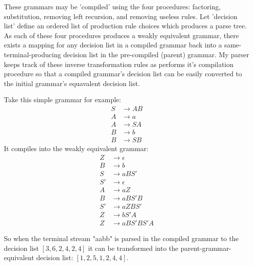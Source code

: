 \documentclass[11pt]{article}
\begin{document}
These grammars may be 'compiled' using the four procedures:
factoring, substitution, removing left recursion, and removing useless
rules. Let 'decision list' define an ordered list of production rule
choices which produces a parse tree.
As each of these four procedures produces a weakly equivalent grammar,
there exists a mapping for any decision list in a compiled grammar
back into a same-terminal-producing decision list in the pre-compiled (parent) grammar.
My parser keeps track of these inverse transformation rules as performs
it's compilation procedure so that a compiled grammar's decision list can be easily
converted to the initial grammar's equavalent decision list. 

Take this simple grammar for example:
\setcounter{equation}{0}
\begin{align}
S &\rightarrow A B\\
A &\rightarrow a\\
A &\rightarrow S A\\
B &\rightarrow b\\
B &\rightarrow S B
\end{align}
It compiles into the weakly equivalent grammar:
\setcounter{equation}{0}
\begin{align}
Z &\rightarrow \epsilon\\
B &\rightarrow b\\
S &\rightarrow a B S'\\
S' &\rightarrow \epsilon\\
A &\rightarrow a Z\\
B &\rightarrow a B S' B\\
S' &\rightarrow a Z B S'\\
Z &\rightarrow b S' A\\
Z &\rightarrow a B S' B S' A
\end{align}

So when the terminal stream "aabb" is parsed in the compiled
grammar to the decision list $[3, 6, 2, 4, 2, 4]$ it can be transformed
into the parent-grammar-equivalent decision list: $[1, 2, 5, 1, 2, 4, 4]$.
\end{document}
